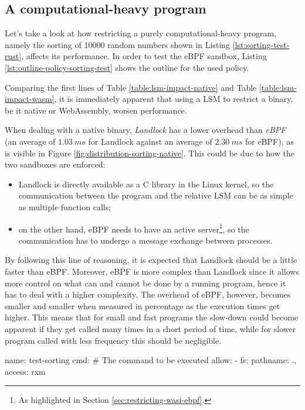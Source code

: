 \subsection{A computational-heavy program}

Let's take a look at how restricting a purely computational-heavy program, namely the sorting of 
10000 random numbers shown in Listing \ref{lst:sorting-test-rust}, affects its performance.
In order to test the eBPF sandbox, Listing \ref{lst:outline-policy-sorting-test} shows the outline for the used policy.

Comparing the first lines of Table \ref{table:lsm-impact-native} and Table \ref{table:lsm-impact-wasm},
it is immediately apparent that using a LSM to restrict a binary, be it native or WebAssembly, worsen performance.

When dealing with a native binary, \textit{Landlock} has a lower overhead than \textit{eBPF} (an average
of $1.03\ ms$ for Landlock against an average of $2.30\ ms$ for eBPF), as is visible in Figure \ref{fig:distribution-sorting-native}.
This could be due to how the two sandboxes are enforced:
\begin{itemize}
  \item Landlock is directly available as a C library in the Linux kernel, so the communication between
        the program and the relative LSM can be as simple as multiple function calls;
  \item on the other hand, eBPF needs to have an active server\footnote{As highlighted in Section \ref{sec:restricting-wasi-ebpf}.},
        so the communication has to undergo a message exchange between processes.
\end{itemize}
By following this line of reasoning, it is expected that Landlock should be a little faster than eBPF.
Moreover, eBPF is more complex than Landlock since it allows more control on what
can and cannot be done by a running program, hence it has to deal with a higher complexity.
The overhead of eBPF, however, becomes smaller and smaller when measured in percentage as the execution times get higher.
This means that for small and fast programs the slow-down could become apparent if they get called many times
in a short period of time, while for slower program called with less frequency this should be negligible.

\vspace*{0.5cm}
\begin{code}[language=yaml, caption=The outline of the policy used for testing the sorting program., label=lst:outline-policy-sorting-test]
name: test-sorting
cmd: # The command to be executed
allow:
- fs: {pathname: ., access: rxm}
\end{code}

